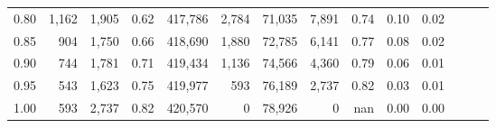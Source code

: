 \begin{tabular}{rrrrrrrrrrrrrr}
0.80 &    1,162 &  1,905 &  0.62 &  417,786 &    2,784 &  71,035 &   7,891 &  0.74 &  0.10 &      0.02 \\
0.85 &      904 &  1,750 &  0.66 &  418,690 &    1,880 &  72,785 &   6,141 &  0.77 &  0.08 &      0.02 \\
0.90 &      744 &  1,781 &  0.71 &  419,434 &    1,136 &  74,566 &   4,360 &  0.79 &  0.06 &      0.01 \\
0.95 &      543 &  1,623 &  0.75 &  419,977 &      593 &  76,189 &   2,737 &  0.82 &  0.03 &      0.01 \\
1.00 &      593 &  2,737 &  0.82 &  420,570 &        0 &  78,926 &       0 &   nan &  0.00 &      0.00 \\
\bottomrule
\end{tabular}
